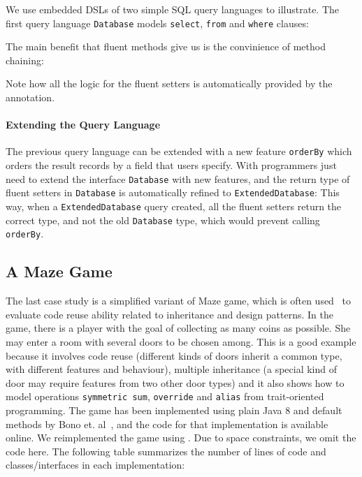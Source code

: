 \noindent We use embedded DSLs of two simple SQL query languages to illustrate.
The first query language \texttt{Database}  models
\texttt{select}, \texttt{from} and \texttt{where} clauses:

\noindent The main benefit that fluent methods give
us is the convinience of method chaining:


\noindent Note how all the logic for the fluent setters is automatically provided by the \mixin annotation. 

\paragraph{Extending the Query Language} The previous query language can be extended with a new feature
\texttt{orderBy} which orders the result records by a field that users
specify. With \mixin programmers just need to extend the interface \texttt{Database} with new
features, and the return type of fluent setters in
\texttt{Database} is automatically refined to \texttt{ExtendedDatabase}:
This way, when a \texttt{ExtendedDatabase} query created, 
all the fluent setters return the correct type, and not the old \texttt{Database} type, which would prevent calling 
\texttt{orderBy}.


\subsection{A Maze Game}
The last case study is a simplified variant of Maze game, which is often
used~\cite{gof,bono14} 
to evaluate code reuse ability related to inheritance and design
patterns. In the game, there is a player with the goal of collecting
as many coins as possible. She may enter a room with several doors to
be chosen among. This is a good example because it involves code reuse
(different kinds of doors inherit a common type, with different
features and behaviour), multiple inheritance (a special kind of door
may require features from two other door types) and it also shows how
to model operations \texttt{symmetric sum}, \texttt{override} and
\texttt{alias} from trait-oriented programming. The game has been
implemented using plain Java 8 and default methods by Bono
et. al~\cite{bono14}, and the code for that implementation is
available online. We reimplemented the game using \mixin. Due to space
constraints, we omit the code here. The following table summarizes
the number of lines of code and classes/interfaces in each implementation:

